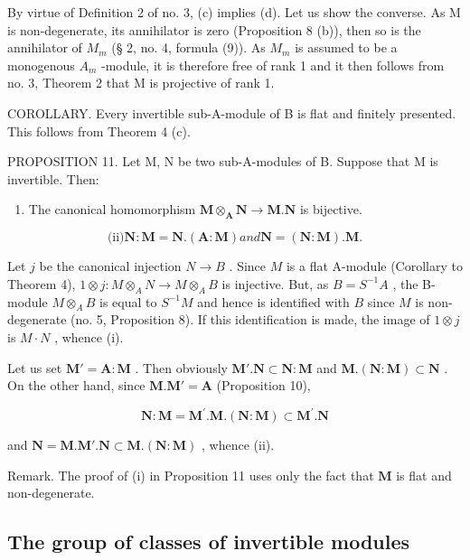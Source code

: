 By virtue of Definition 2 of no. 3, (c) implies (d). Let us show the converse. As M is non-degenerate, its annihilator is zero (Proposition 8 (b)), then so is the annihilator of \(M_{m}\) (§ 2, no. 4, formula (9)). As \(M_{m}\) is assumed to be a monogenous \(A_{m}\) -module, it is therefore free of rank 1 and it then follows from no. 3, Theorem 2 that M is projective of rank 1.

COROLLARY. Every invertible sub-A-module of B is flat and finitely presented. This follows from Theorem 4 (c).

PROPOSITION 11. Let M, N be two sub-A-modules of B. Suppose that M is invertible. Then:

\begin{enumerate}
\def\labelenumi{(\roman{enumi})}
\tightlist
\item
  The canonical homomorphism \(\mathbf{M} \otimes_{\mathbf{A}} \mathbf{N} \to \mathbf{M}. \mathbf{N}\) is bijective.
\end{enumerate}

\[
\text {(ii)} \mathbf {N}: \mathbf {M} = \mathbf {N}. (\mathbf {A}: \mathbf {M}) a n d \mathbf {N} = (\mathbf {N}: \mathbf {M}). \mathbf {M}.
\]

Let \(j\) be the canonical injection \(N \to B\) . Since \(M\) is a flat A-module (Corollary to Theorem 4), \(1 \otimes j \colon M \otimes_{A} N \to M \otimes_{A} B\) is injective. But, as \(B = S^{-1}A\) , the B-module \(M \otimes_{A} B\) is equal to \(S^{-1}M\) and hence is identified with \(B\) since \(M\) is non-degenerate (no. 5, Proposition 8). If this identification is made, the image of \(1 \otimes j\) is \(M \cdot N\) , whence (i).

Let us set \(\mathbf{M}' = \mathbf{A} : \mathbf{M}\) . Then obviously \(\mathbf{M}' . \mathbf{N} \subset \mathbf{N} : \mathbf{M}\) and \(\mathbf{M} . (\mathbf{N} : \mathbf{M}) \subset \mathbf{N}\) . On the other hand, since \(\mathbf{M} . \mathbf{M}' = \mathbf{A}\) (Proposition 10),

\[
\mathbf {N}: \mathbf {M} = \mathbf {M} ^ {\prime}. \mathbf {M}. (\mathbf {N}: \mathbf {M}) \subset \mathbf {M} ^ {\prime}. \mathbf {N}
\]

and \(\mathbf{N} = \mathbf{M}.\mathbf{M}'.\mathbf{N}\subset \mathbf{M}.(\mathbf{N}:\mathbf{M})\) , whence (ii).

Remark. The proof of (i) in Proposition 11 uses only the fact that \(\mathbf{M}\) is flat and non-degenerate.

\subsection{The group of classes of invertible modules}

